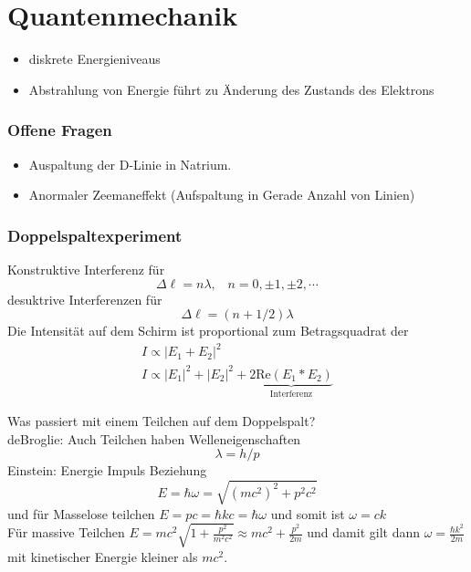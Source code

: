 \chapter{Quantenmechanik}
\begin{itemize}
	\item diskrete Energieniveaus
	\item Abstrahlung von Energie führt zu Änderung des Zustands des Elektrons 
\end{itemize}
\subsection*{Offene Fragen}
\begin{itemize}
	\item Auspaltung der D-Linie in Natrium.
	\item Anormaler Zeemaneffekt (Aufspaltung in Gerade Anzahl von Linien)
\end{itemize}

\subsection{Doppelspaltexperiment}

Konstruktive Interferenz für
$$
\Delta \ell = n\lambda, \;\;\; n = 0, \pm1, \pm2,\cdots
$$
desuktrive Interferenzen für
$$
\Delta \ell = (n+1/2)\lambda
$$
Die Intensität auf dem Schirm ist proportional zum Betragsquadrat der
\begin{gather}
	I \propto |E_1 + E_2|^2\\
	I \propto |E_1|^2 + |E_2|^2 + \underbrace{2\text{Re}(E_1* E_2)}_{\text{Interferenz}}
\end{gather}

Was passiert mit einem Teilchen auf dem Doppelspalt?\\
deBroglie: Auch Teilchen haben Welleneigenschaften
$$
\lambda = h/p
$$
Einstein: Energie Impuls Beziehung
$$
E = \hbar\omega = \sqrt{(mc^2)^2 + p^2c^2}
$$
und für Masselose teilchen $E=pc = \hbar kc = \hbar\omega$ und somit ist $\omega = ck$\\
Für massive Teilchen $E = mc^2 \sqrt{1 + \frac{p^2}{m^2c^2}} \approx mc^2 + \frac{p^2}{2m}$ und damit gilt dann $\omega = \frac{\hbar k^2}{2m}$ mit kinetischer Energie kleiner als $mc^2$.

